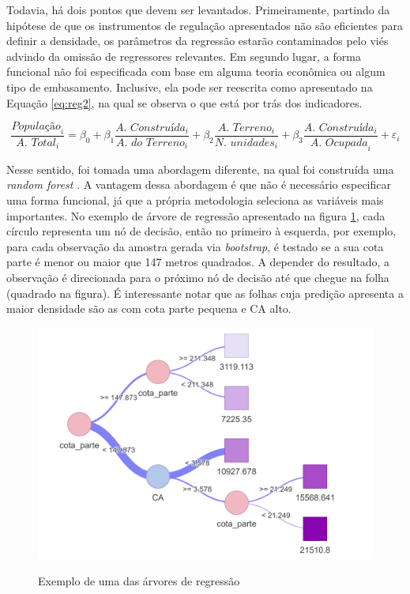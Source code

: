 Todavia, há dois pontos que devem ser levantados. Primeiramente, partindo da hipótese de que os instrumentos de regulação apresentados não são eficientes para definir a densidade, os parâmetros da regressão estarão contaminados pelo viés advindo da omissão de regressores relevantes. Em segundo lugar, a forma funcional não foi especificada com base em alguma teoria econômica ou algum tipo de embasamento. Inclusive, ela pode ser reescrita como apresentado na Equação \ref{eq:reg2}, na qual se observa o que está por trás dos indicadores.

\begin{equation}
    \frac{\textit{População}_i}{\textit{A. Total}_i}=\beta_0+\beta_1\frac{\textit{A. Construída}_i}{\textit{A. do Terreno}_i}+\beta_2\frac{\textit{A. Terreno}_i}{\textit{N. unidades}_i}+\beta_3\frac{\textit{A. Construída}_i}{\textit{A. Ocupada}_i}+\varepsilon_i
    \label{eq:reg2}
\end{equation}

Nesse sentido, foi tomada uma abordagem diferente, na qual foi construída uma \textit{random forest} \cite{wright2015ranger}. A vantagem dessa abordagem é que não é necessário especificar uma forma funcional, já que a própria metodologia seleciona as variáveis mais importantes. No exemplo de árvore de regressão apresentado na figura \ref{fig:tree}, cada círculo representa um nó de decisão, então no primeiro à esquerda, por exemplo, para cada observação da amostra gerada via \textit{bootstrap}, é testado se a sua cota parte é menor ou maior que 147 metros quadrados. A depender do resultado, a observação é direcionada para o próximo nó de decisão até que chegue na folha (quadrado na figura). É interessante notar que as folhas cuja predição apresenta a maior densidade são as com cota parte pequena e CA alto.

\begin{figure}[h]
    \centering
    \caption{Exemplo de uma das árvores de regressão}
    \includegraphics[width = .8\linewidth]{imagens/tree_example.png}
    \label{fig:tree}
\end{figure}

